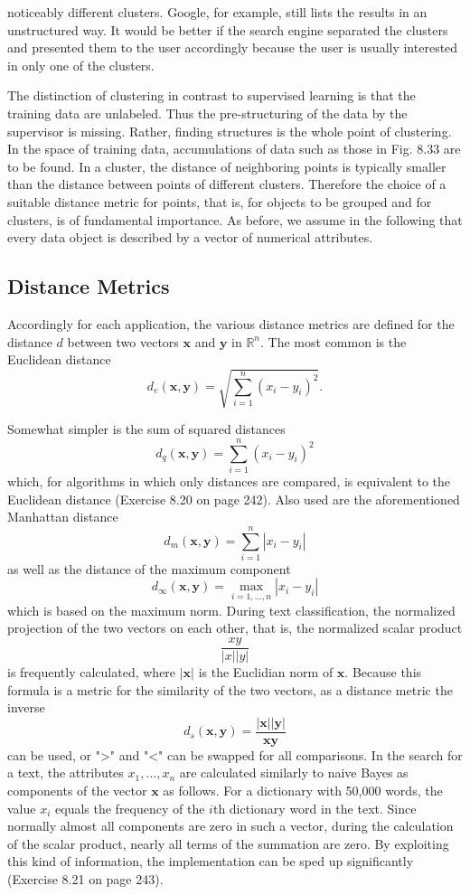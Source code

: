 \documentclass[10pt]{book}
\begin{document}
noticeably different clusters. Google, for example, still lists the results in an unstructured way. It would be better if the search engine separated the clusters and presented them to the user accordingly because the user is usually interested in only one of the clusters.

The distinction of clustering in contrast to supervised learning is that the training data are unlabeled. Thus the pre-structuring of the data by the supervisor is missing. Rather, finding structures is the whole point of clustering. In the space of training data, accumulations of data such as those in Fig. 8.33 are to be found. In a cluster, the distance of neighboring points is typically smaller than the distance between points of different clusters. Therefore the choice of a suitable distance metric for points, that is, for objects to be grouped and for clusters, is of fundamental importance. As before, we assume in the following that every data object is described by a vector of numerical attributes.

\subsection{Distance Metrics}
Accordingly for each application, the various distance metrics are defined for the distance $d$ between two vectors $\boldsymbol{x}$ and $\boldsymbol{y}$ in $\mathbb{R}^{n}$. The most common is the Euclidean distance
$$
d_{e}(\boldsymbol{x}, \boldsymbol{y})=\sqrt{\sum_{i=1}^{n}\left(x_{i}-y_{i}\right)^{2}} .
$$

Somewhat simpler is the sum of squared distances
$$
d_{q}(\boldsymbol{x}, \boldsymbol{y})=\sum_{i=1}^{n}\left(x_{i}-y_{i}\right)^{2}
$$
which, for algorithms in which only distances are compared, is equivalent to the Euclidean distance (Exercise 8.20 on page 242). Also used are the aforementioned Manhattan distance
$$
d_{m}(\boldsymbol{x}, \boldsymbol{y})=\sum_{i=1}^{n}\left|x_{i}-y_{i}\right|
$$
as well as the distance of the maximum component
$$
d_{\infty}(\boldsymbol{x}, \boldsymbol{y})=\max _{i=1, \ldots, n}\left|x_{i}-y_{i}\right|
$$
which is based on the maximum norm. During text classification, the normalized projection of the two vectors on each other, that is, the normalized scalar product
$$
\frac{x y}{|x||y|}
$$
is frequently calculated, where $|\boldsymbol{x}|$ is the Euclidian norm of $\boldsymbol{x}$. Because this formula is a metric for the similarity of the two vectors, as a distance metric the inverse
$$
d_{s}(\boldsymbol{x}, \boldsymbol{y})=\frac{|\boldsymbol{x}||\boldsymbol{y}|}{\boldsymbol{x} \boldsymbol{y}}
$$
can be used, or ">" and "<" can be swapped for all comparisons. In the search for a text, the attributes $x_{1}, \ldots, x_{n}$ are calculated similarly to naive Bayes as components of the vector $\boldsymbol{x}$ as follows. For a dictionary with 50,000 words, the value $x_{i}$ equals the frequency of the $i$th dictionary word in the text. Since normally almost all components are zero in such a vector, during the calculation of the scalar product, nearly all terms of the summation are zero. By exploiting this kind of information, the implementation can be sped up significantly (Exercise 8.21 on page 243).
\end{document}
